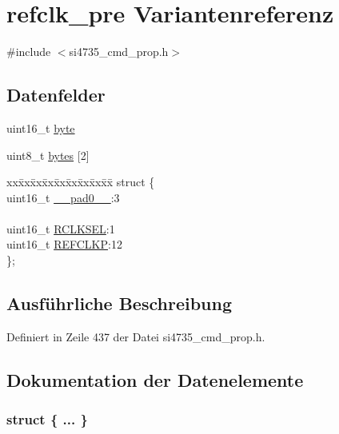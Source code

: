 \hypertarget{unionrefclk__pre}{}\section{refclk\+\_\+pre Variantenreferenz}
\label{unionrefclk__pre}


{\ttfamily \#include $<$si4735\+\_\+cmd\+\_\+prop.\+h$>$}

\subsection*{Datenfelder}
\begin{DoxyCompactItemize}
\item 
uint16\+\_\+t \hyperlink{unionrefclk__pre_ab0549c1b5ea980a02e7eab77e21fea49}{byte}
\item 
uint8\+\_\+t \hyperlink{unionrefclk__pre_a46e4c05d20a047ec169f60d3167e912e}{bytes} \mbox{[}2\mbox{]}
\item 
\begin{tabbing}
xx\=xx\=xx\=xx\=xx\=xx\=xx\=xx\=xx\=\kill
struct \{\\
\>uint16\_t \hyperlink{unionrefclk__pre_a77132c2c26a75f5b8751b235cda23828}{\_\_pad0\_\_}:3\\
\>\\
\>uint16\_t \hyperlink{unionrefclk__pre_a58f70e82912101800a780a4e8d24345d}{RCLKSEL}:1\\
\>uint16\_t \hyperlink{unionrefclk__pre_a546b4baeb928274149bafc12e1b720ff}{REFCLKP}:12\\
\}; \\

\end{tabbing}\end{DoxyCompactItemize}


\subsection{Ausführliche Beschreibung}


Definiert in Zeile 437 der Datei si4735\+\_\+cmd\+\_\+prop.\+h.



\subsection{Dokumentation der Datenelemente}
\hypertarget{unionrefclk__pre_a3e0747646412a75f934730c22ac67d34}{}\subsubsection[{"@45}]{\setlength{\rightskip}{0pt plus 5cm}struct \{ ... \} }\label{unionrefclk__pre_a3e0747646412a75f934730c22ac67d34}
\hypertarget{unionrefclk__pre_a77132c2c26a75f5b8751b235cda23828}{}
